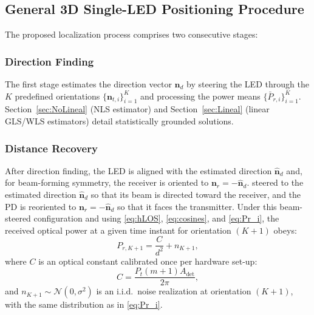 \documentclass[journal]{IEEEtran}
\newcommand{\added}[1]{{\color{blue}#1}}
\newcommand{\deleted}[1]{{\color{red}#1}}
\begin{document}
\subsection{General 3D Single-LED Positioning Procedure}

The proposed localization process comprises two consecutive stages:

\subsubsection{Direction Finding}

The first stage estimates the direction vector \(\mathbf{n}_{d}\) by steering the LED through the
\(K\) predefined orientations \(\{\mathbf{n}_{t,i}\}_{i=1}^{K}\) and processing
the power means \(\{\bar P_{r,i}\}_{i=1}^{K}\).  
Section~\ref{sec:NoLineal} (NLS estimator) and Section~\ref{sec:Lineal} (linear GLS/WLS estimators) detail statistically grounded solutions.

\subsubsection{Distance Recovery}

After direction finding, the LED is \deleted{aligned with the estimated direction
$\hat{\mathbf{n}}_{d}$ and, for beam-forming symmetry, the receiver is oriented to
$\mathbf{n}_{r}=-\hat{\mathbf{n}}_{d}$.} \added{steered to the estimated direction $\hat{\mathbf{n}}_{d}$ so that its beam is directed toward the receiver, and the PD is reoriented to $\mathbf{n}_r = -\hat{\mathbf{n}}_d$ so that it faces the transmitter.} 
Under this beam-steered configuration and using \eqref{eq:hLOS}, \eqref{eq:cosines}, and \eqref{eq:Pr_i},
the received optical power at a given time instant for orientation \((K+1)\) obeys:
\begin{equation}
P_{r,K+1}= \frac{C}{d^{2}}+n_{K+1},
\label{eq:beamSteeredMean}
\end{equation}
where \(C\) is an optical constant calibrated once per hardware set-up:
\begin{equation}
C = \frac{P_{t}(m+1)A_{\text{det}}}{2\pi},
\label{eq:constant_C}
\end{equation} 
and \(n_{K+1}\sim\mathcal{N}(0,\sigma^{2})\) is an i.i.d.\ noise realization at orientation \((K+1)\), with the same distribution as in \eqref{eq:Pr_i}.
\end{document}

